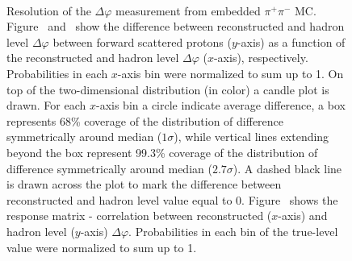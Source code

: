 \begin{figure}[h]
{  \centering
  \begin{subfigure}[b]{\linewidth}\addtocounter{subfigure}{-2}\vspace*{-12pt}
  \end{subfigure}\\
    \begin{minipage}[t][1.042\linewidth][t]{\linewidth}\vspace{10pt}
    \caption[Resolution of the $\Delta\varphi$ measurement from embedded $\pi^{+}\pi^{-}$ MC.]{Resolution of the $\Delta\varphi$ measurement from embedded $\pi^{+}\pi^{-}$ MC. Figure~ and~ show the difference between reconstructed and hadron level $\Delta\varphi$ between forward scattered protons ($y$-axis) as a function of the reconstructed and hadron level $\Delta\varphi$ ($x$-axis), respectively. Probabilities in each $x$-axis bin were normalized to sum up to 1. On top of the two-dimensional distribution (in color) a candle plot is drawn. For each $x$-axis bin a circle indicate average difference, a box represents 68\% coverage of the distribution of difference symmetrically around median ($1\sigma$), while vertical lines extending beyond the box represent 99.3\% coverage of the distribution of difference symmetrically around median ($2.7\sigma$). A dashed black line is drawn across the plot to mark the difference between reconstructed and hadron level value equal to 0. Figure~ shows the response matrix - correlation between reconstructed ($x$-axis) and hadron level ($y$-axis) $\Delta\varphi$. Probabilities in each bin of the true-level value were normalized to sum up to 1.}\label{fig:Response_DeltaPhi}%
  \end{minipage}
}%
\end{figure}



